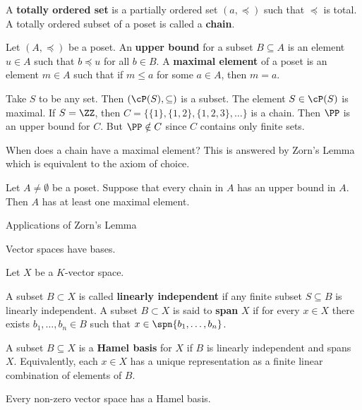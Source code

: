 \begin{defn}
  A \textbf{totally ordered set} is a partially ordered set $(a,\preceq)$ such that $\preceq$ is total.
  A totally ordered subset of a poset is called a \textbf{chain}.
\end{defn}

\begin{defn}
  Let $(A,\preceq)$ be a poset.
  An \textbf{upper bound} for a subset $B \subseteq A$ is an element $u \in A$ such that $b \preceq u$ for all $b \in B$.
  A \textbf{maximal element} of a poset is an element $m \in A$ such that if $m \leq a$ for some $a \in A$, then $m=a$.
\end{defn}

\begin{exam}
  Take $S$ to be any set. Then $(\cP(S),\subseteq)$ is a subset.
  The element $S \in \cP(S)$ is maximal.
  If $S=\ZZ$, then $C=\{\{1\},\{1,2\},\{1,2,3\},\ldots\}$ is a chain.
  Then $\PP$ is an upper bound for $C$.
  But $\PP \notin C$ since $C$ contains only finite sets.
\end{exam}

When does a chain have a maximal element?
This is answered by Zorn's Lemma which is equivalent to the axiom of choice.

\begin{thm}
  Let $A \neq \emptyset$ be a poset.
  Suppose that every chain in $A$ has an upper bound in $A$.
  Then $A$ has at least one maximal element.
\end{thm}

Applications of Zorn's Lemma

Vector spaces have bases.

\begin{defn}
  Let $X$ be a $K$-vector space.
  \begin{enum}
    \io A subset $B \subset X$ is called \textbf{linearly independent} if any finite subset $S \subseteq B$ is linearly independent.
    \io A subset $B \subset X$ is said to \textbf{span} $X$ if for every $x \in X$ there exists $b_1,\ldots,b_n \in B$ such that $x \in \spn\{b_1,\ldots,b_n\}$.
  \end{enum}
  A subset $B \subseteq X$ is a \textbf{Hamel basis} for $X$ if $B$ is linearly independent and spans $X$.
  Equivalently, each $x \in X$ has a unique representation as a finite linear combination of elements of $B$.
\end{defn}

\begin{thm}
  Every non-zero vector space has a Hamel basis.
\end{thm}
